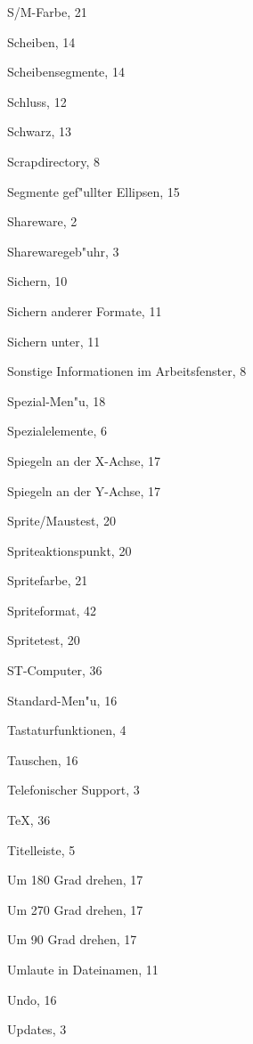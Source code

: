 \begin{theindex}
  \indexspace

  \item S/M-Farbe, 21
  \item Scheiben, 14
  \item Scheibensegmente, 14
  \item Schluss, 12
  \item Schwarz, 13
  \item Scrapdirectory, 8
  \item Segmente gef"ullter Ellipsen, 15
  \item Shareware, 2
  \item Sharewaregeb"uhr, 3
  \item Sichern, 10
  \item Sichern anderer Formate, 11
  \item Sichern unter, 11
  \item Sonstige Informationen im Arbeitsfenster, 8
  \item Spezial-Men"u, 18
  \item Spezialelemente, 6
  \item Spiegeln an der X-Achse, 17
  \item Spiegeln an der Y-Achse, 17
  \item Sprite/Maustest, 20
  \item Spriteaktionspunkt, 20
  \item Spritefarbe, 21
  \item Spriteformat, 42
  \item Spritetest, 20
  \item ST-Computer, 36
  \item Standard-Men"u, 16

  \indexspace

  \item Tastaturfunktionen, 4
  \item Tauschen, 16
  \item Telefonischer Support, 3
  \item \TeX, 36
  \item Titelleiste, 5

  \indexspace

  \item Um 180 Grad drehen, 17
  \item Um 270 Grad drehen, 17
  \item Um 90 Grad drehen, 17
  \item Umlaute in Dateinamen, 11
  \item Undo, 16
  \item Updates, 3


\end{theindex}
